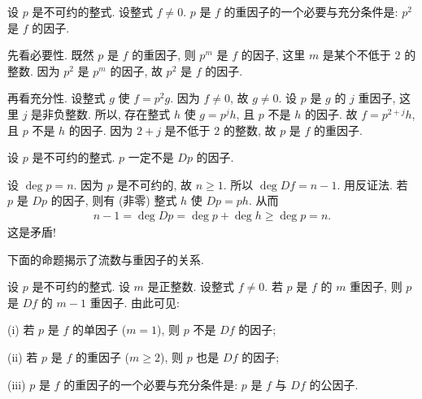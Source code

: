 \begin{proposition}
    设 $p$ 是不可约的整式. 设整式 $f \neq 0$. $p$ 是 $f$ 的重因子的一个必要与充分条件是: $p^2$ 是 $f$ 的因子.
\end{proposition}

\begin{pf}
    先看必要性. 既然 $p$ 是 $f$ 的重因子, 则 $p^m$ 是 $f$ 的因子, 这里 $m$ 是某个不低于 $2$ 的整数. 因为 $p^2$ 是 $p^m$ 的因子, 故 $p^2$ 是 $f$ 的因子.

    再看充分性. 设整式 $g$ 使 $f = p^2 g$. 因为 $f \neq 0$, 故 $g \neq 0$. 设 $p$ 是 $g$ 的 $j$ 重因子, 这里 $j$ 是非负整数. 所以, 存在整式 $h$ 使 $g = p^j h$, 且 $p$ 不是 $h$ 的因子. 故 $f = p^{2+j} h$, 且 $p$ 不是 $h$ 的因子. 因为 $2+j$ 是不低于 $2$ 的整数, 故 $p$ 是 $f$ 的重因子.
\end{pf}

\begin{proposition}
    设 $p$ 是不可约的整式. $p$ 一定不是 $Dp$ 的因子.
\end{proposition}

\begin{pf}
    设 $\deg p = n$. 因为 $p$ 是不可约的, 故 $n \geq 1$. 所以 $\deg Df = n - 1$. 用反证法. 若 $p$ 是 $Dp$ 的因子, 则有 (非零) 整式 $h$ 使 $Dp = ph$. 从而
    \begin{align*}
        n - 1 = \deg Dp = \deg p + \deg h \geq \deg p = n.
    \end{align*}
    这是矛盾!
\end{pf}

下面的命题揭示了流数与重因子的关系.

\begin{proposition}
    设 $p$ 是不可约的整式. 设 $m$ 是正整数. 设整式 $f \neq 0$. 若 $p$ 是 $f$ 的 $m$ 重因子, 则 $p$ 是 $Df$ 的 $m-1$ 重因子. 由此可见:

    (i) 若 $p$ 是 $f$ 的单因子 ($m = 1$), 则 $p$ 不是 $Df$ 的因子;

    (ii) 若 $p$ 是 $f$ 的重因子 ($m \geq 2$), 则 $p$ 也是 $Df$ 的因子;

    (iii) $p$ 是 $f$ 的重因子的一个必要与充分条件是: $p$ 是 $f$ 与 $Df$ 的公因子.
\end{proposition}

